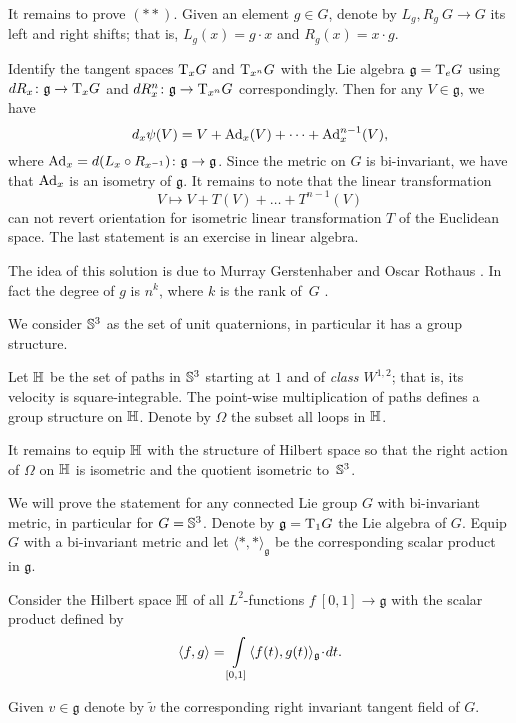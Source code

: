 It remains to prove $({*}{*})$.
Given an element $g\in G$, denote by $L_g,R_g\:G\to G$ its left and right shifts;
that is, $L_g(x)=g\cdot x$ and $R_g(x)=x\cdot g$.

Identify the tangent spaces $\mathrm{T}_xG$ and $\mathrm{T}_{x^n}G$ with the Lie algebra $\mathfrak{g}=\mathrm{T}_eG$
using $d{R_x}\colon\mathfrak{g}\to \mathrm{T}_xG$ and $d{R_x^n}\colon\mathfrak{g}\to \mathrm{T}_{x^n}G$ correspondingly.
Then for any $V\in \mathfrak{g}$, we have
\[d_x\psi(V)=V+\mathrm{Ad}_x(V)+\dots+\mathrm{Ad}_x^{n-1}(V),\]
where $\mathrm{Ad}_x=d(L_x\circ R_{x^{-1}})\colon\mathfrak{g}\to \mathfrak{g}$. 
Since the metric on $G$ is bi-invariant, we have that $\mathrm{Ad}_x$ is an isometry of $\mathfrak{g}$.
It remains to note that the linear transformation
\[V\mapsto V+T(V)+\dots+T^{n-1}(V)\]
can not revert orientation for isometric linear transformation $T$ of the Euclidean space.
The last statement is an exercise in linear algebra.
\qeds

The idea of this solution is due to Murray Gerstenhaber and Oscar Rothaus 
\cite[see][]{gerstenhaber-rothaus}.
In fact the degree of $g$ is $n^k$, where $k$ is the rank of~$G$ \cite[see][]{hopf}.

We consider $\mathbb{S}^3$ as the set of unit quaternions, in particular it has a group structure.

Let $\mathbb{H}$ be the set of paths in $\mathbb{S}^3$ starting at $1$ and of \emph{class $W^{1,2}$};
that is, its velocity is square-integrable.
The point-wise multiplication of paths defines a group structure on $\mathbb{H}$.
Denote by $\Omega$ the subset all loops in $\mathbb{H}$.

It remains to equip $\mathbb{H}$ with the structure of Hilbert space so that 
the right action of $\Omega$ on $\mathbb{H}$ is isometric and the quotient isometric to~$\mathbb{S}^3$.

\medskip

We will prove the statement for any connected Lie group $G$ with bi-invariant metric, in particular for $G=\mathbb{S}^3$.
Denote by $\mathfrak{g}=\mathrm{T}_1G$ the Lie algebra of $G$.
Equip $G$ with a bi-invariant metric and let $\langle{*},{*}\rangle_{\mathfrak{g}}$ be the corresponding scalar product in $\mathfrak{g}$.

Consider the Hilbert space $\mathbb{H}$ of all $L^2$-functions $f\:[0,1]\to\mathfrak{g}$ with the scalar product defined by
\[\<f,g\>=\int\limits_{[0,1]}\<f(t),g(t)\>_{\mathfrak{g}}\cdot dt.\]


Given $v\in \mathfrak{g}$ denote by $\tilde v$ the corresponding right invariant tangent field of $G$.

